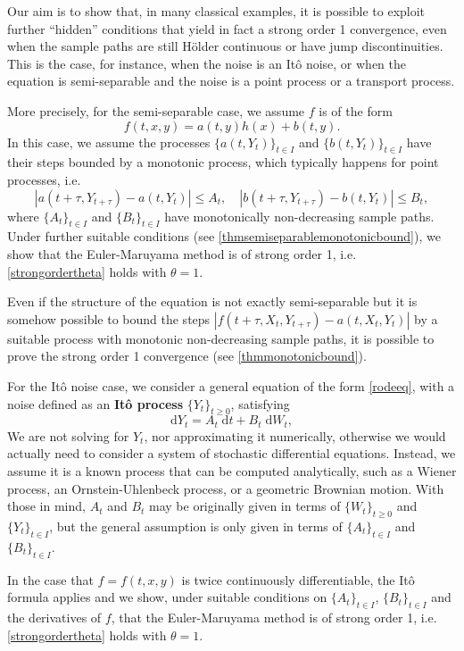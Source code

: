 \documentclass[reqno,12pt]{amsart}
\theoremstyle{plain}%
\theoremstyle{definition}
\begin{document}
Our aim is to show that, in many classical examples, it is possible to exploit further ``hidden'' conditions that yield in fact a strong order 1 convergence, even when the sample paths are still H\"older continuous or have jump discontinuities. This is the case, for instance, when the noise is an It\^o noise, or when the equation is semi-separable and the noise is a point process or a transport process.

More precisely, for the semi-separable case, we assume $f$ is of the form 
\[
    f(t, x, y) = a(t, y)h(x) + b(t, y).  
\]
In this case, we assume the processes $\{a(t, Y_t)\}_{t\in I}$ and $\{b(t, Y_t)\}_{t\in I}$ have their steps bounded by a monotonic process, which typically happens for point processes, i.e.
\[
|a(t+\tau, Y_{t+\tau}) - a(t, Y_t)| \leq A_t, \quad |b(t+\tau, Y_{t+\tau}) - b(t, Y_t)| \leq B_t,
\]
where $\{A_t\}_{t\in I}$ and $\{B_t\}_{t\in I}$ have monotonically non-decreasing sample paths. Under further suitable conditions (see \cref{thmsemiseparablemonotonicbound}), we show that the Euler-Maruyama method is of strong order 1, i.e. \eqref{strongordertheta} holds with $\theta=1$.

Even if the structure of the equation is not exactly semi-separable but it is somehow possible to bound the steps $|f(t+\tau, X_t, Y_{t+\tau}) - a(t, X_t, Y_t)|$ by a suitable process with monotonic non-decreasing sample paths, it is possible to prove the strong order 1 convergence (see \cref{thmmonotonicbound}).

For the It\^o noise case, we consider a general equation of the form \eqref{rodeeq}, with a noise defined as an \textbf{It\^o process} $\{Y_t\}_{t\geq 0}$, satisfying
\begin{equation}
  \mathrm{d}Y_t = A_t \;\mathrm{d}t + B_t \;\mathrm{d}W_t,
\end{equation}
We are not solving for $Y_t$, nor approximating it numerically, otherwise we would actually need to consider a system of stochastic differential equations. Instead, we assume it is a known process that can be computed analytically, such as a Wiener process, an Ornstein-Uhlenbeck process, or a geometric Brownian motion. With those in mind, $A_t$ and $B_t$ may be originally given in terms of $\{W_t\}_{t\geq 0}$ and $\{Y_t\}_{t\in I}$, but the general assumption is only given in terms of $\{A_t\}_{t\in I}$ and $\{B_t\}_{t\in I}$.

In the case that $f=f(t, x, y)$ is twice continuously differentiable, the It\^o formula applies and we show, under suitable conditions on $\{A_t\}_{t\in I}$, $\{B_t\}_{t\in I}$ and the derivatives of $f$, that the Euler-Maruyama method is of strong order 1, i.e. \eqref{strongordertheta} holds with $\theta=1$.
\end{document}
